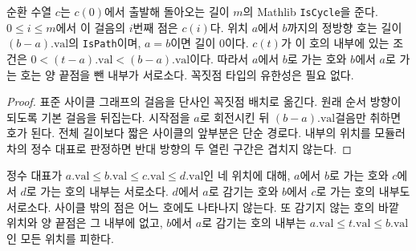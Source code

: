 \begin{lemma}
\label{lem:cycseq_walks}
\leanok
순환 수열 \(c\)는 \(c(0)\)에서 출발해 돌아오는 길이 \(m\)의 Mathlib \texttt{IsCycle}을 준다.
\(0 \le i \le m\)에서 이 걸음의 \(i\)번째 점은 \(c(i)\)다. 위치 \(a\)에서 \(b\)까지의 정방향 호는
길이 \((b-a).\mathrm{val}\)의 \texttt{IsPath}이며, \(a=b\)이면 길이 0이다. \(c(t)\)가 이 호의 내부에
있는 조건은 \(0 < (t-a).\mathrm{val} < (b-a).\mathrm{val}\)이다. 따라서 \(a\)에서 \(b\)로 가는 호와
\(b\)에서 \(a\)로 가는 호는 양 끝점을 뺀 내부가 서로소다. 꼭짓점 타입의 유한성은 필요 없다.
\end{lemma}

\begin{proof}
\leanok
표준 사이클 그래프의 걸음을 단사인 꼭짓점 배치로 옮긴다. 원래 순서 방향이 되도록 기본 걸음을 뒤집는다.
시작점을 \(a\)로 회전시킨 뒤 \((b-a).\mathrm{val}\)걸음만 취하면 호가 된다. 전체 길이보다 짧은 사이클의
앞부분은 단순 경로다. 내부의 위치를 모듈러 차의 정수 대표로 판정하면 반대 방향의 두 열린 구간은 겹치지 않는다.
\end{proof}

\begin{lemma}
\label{lem:cycseq_disjoint_arcs}
\leanok
정수 대표가 \(a.\mathrm{val} \le b.\mathrm{val} \le c.\mathrm{val} \le d.\mathrm{val}\)인 네 위치에 대해,
\(a\)에서 \(b\)로 가는 호와 \(c\)에서 \(d\)로 가는 호의 내부는 서로소다. \(d\)에서 \(a\)로 감기는
호와 \(b\)에서 \(c\)로 가는 호의 내부도 서로소다. 사이클 밖의 점은 어느 호에도 나타나지 않는다.
또 감기지 않는 호의 바깥 위치와 양 끝점은 그 내부에 없고, \(b\)에서 \(a\)로 감기는 호의 내부는
\(a.\mathrm{val} \le t.\mathrm{val} \le b.\mathrm{val}\)인 모든 위치를 피한다.
\end{lemma}

